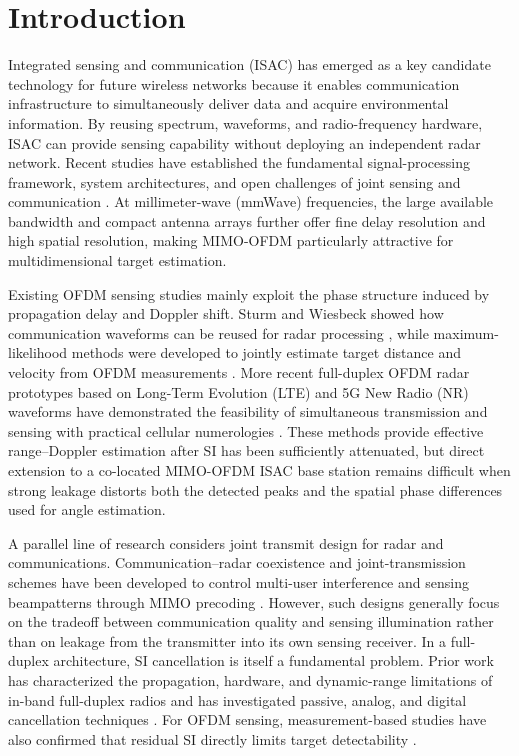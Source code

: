 \documentclass[conference]{IEEEtran}
\begin{document}
\section{Introduction}\label{sec:introduction}
Integrated sensing and communication (ISAC) has emerged as a key candidate technology for future wireless networks because it enables communication infrastructure to simultaneously deliver data and acquire environmental information. By reusing spectrum, waveforms, and radio-frequency hardware, ISAC can provide sensing capability without deploying an independent radar network. Recent studies have established the fundamental signal-processing framework, system architectures, and open challenges of joint sensing and communication \cite{liu2020joint,zhang2021overview,zhang2022survey,liu2022isac}. At millimeter-wave (mmWave) frequencies, the large available bandwidth and compact antenna arrays further offer fine delay resolution and high spatial resolution, making MIMO-OFDM particularly attractive for multidimensional target estimation.

Existing OFDM sensing studies mainly exploit the phase structure induced by propagation delay and Doppler shift. Sturm and Wiesbeck showed how communication waveforms can be reused for radar processing \cite{sturm2011waveform}, while maximum-likelihood methods were developed to jointly estimate target distance and velocity from OFDM measurements \cite{braun2010ml}. More recent full-duplex OFDM radar prototypes based on Long-Term Evolution (LTE) and 5G New Radio (NR) waveforms have demonstrated the feasibility of simultaneous transmission and sensing with practical cellular numerologies \cite{barneto2019fdofdm}. These methods provide effective range--Doppler estimation after SI has been sufficiently attenuated, but direct extension to a co-located MIMO-OFDM ISAC base station remains difficult when strong leakage distorts both the detected peaks and the spatial phase differences used for angle estimation.

A parallel line of research considers joint transmit design for radar and communications. Communication--radar coexistence and joint-transmission schemes have been developed to control multi-user interference and sensing beampatterns through MIMO precoding \cite{liu2018mimo}. However, such designs generally focus on the tradeoff between communication quality and sensing illumination rather than on leakage from the transmitter into its own sensing receiver. In a full-duplex architecture, SI cancellation is itself a fundamental problem. Prior work has characterized the propagation, hardware, and dynamic-range limitations of in-band full-duplex radios and has investigated passive, analog, and digital cancellation techniques \cite{sabharwal2014ibfd,zhang2016fd}. For OFDM sensing, measurement-based studies have also confirmed that residual SI directly limits target detectability \cite{barneto2019fdofdm}.
\end{document}
